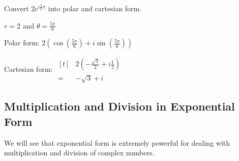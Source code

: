 \documentclass[11pt,a4paper]{book}
\begin{document}
\begin{example}
Convert ${\displaystyle 2e^{i\frac{5}{6}\pi}}$ into polar and cartesian
form.

\medskip{}

\Solution

$r=2$ and ${\displaystyle \theta=\frac{5\pi}{6}}$

Polar form: ${\displaystyle 2\left(\cos\left(\frac{5\pi}{6}\right)+i\sin\left(\frac{5\pi}{6}\right)\right)}$

\medskip{}

Cartesian form:
$
\begin{aligned}[t]
 & 2\left(-\frac{\sqrt{3}}{2}+i\frac{1}{2}\right)\\
= & -\sqrt{3}+i
\end{aligned}
$

\end{example}

\newpage


\subsection{Multiplication and Division in Exponential Form}

We will see that exponential form is extremely powerful for dealing
with multiplication and division of complex numbers.
\end{document}
